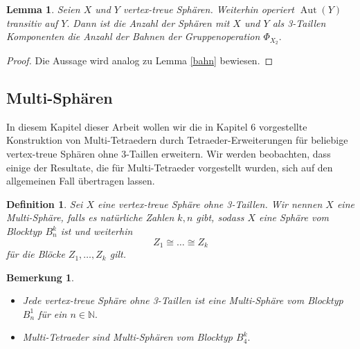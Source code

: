 \documentclass[12pt,titlepage,twoside,cleardoublepage]{article}
\theoremstyle{nummermitklammern}
\newtheorem{lemma}[temp]{Lemma}
\newtheorem{definition}[temp]{Definition}
\newtheorem{bemerkung}[temp]{Bemerkung}
\newtheorem{definition}[zahl]{Definition}
\newtheorem{lemma}[zahl]{Lemma}
\newtheorem{bemerkung}[zahl]{Bemerkung}
\numberwithin{equation}{section}
\DeclareMathOperator{\Aut}{Aut}
\begin{document}
\begin{lemma}
Seien $X$ und $Y$ vertex-treue Sphären. Weiterhin operiert $\Aut(Y)$ transitiv auf $Y.$ Dann ist die Anzahl der Sphären mit $X$ und $Y$ als 3-Taillen Komponenten die Anzahl der Bahnen der Gruppenoperation $\Phi_{X_2}.$
\end{lemma}
\begin{proof}
Die Aussage wird analog zu Lemma \ref{bahn} bewiesen.
\end{proof}
\subsection{Multi-Sphären}
In diesem Kapitel dieser Arbeit wollen wir die in Kapitel 6 vorgestellte Konstruktion von Multi-Tetraedern durch Tetraeder-Erweiterungen für beliebige vertex-treue Sphären ohne 3-Taillen erweitern. Wir werden beobachten, dass einige der Resultate, die für Multi-Tetraeder vorgestellt wurden, sich auf den allgemeinen Fall übertragen lassen.
\begin{definition}
Sei $X$ eine vertex-treue Sphäre ohne 3-Taillen. Wir nennen $X$ eine \emph{Multi-Sphäre}, falls es natürliche Zahlen $k,n$ gibt, sodass $X$ eine Sphäre vom Blocktyp $B_n^k$ ist und weiterhin
\[
Z_1\cong \ldots\cong Z_k
\]
für die Blöcke $Z_1,\ldots,Z_k$ gilt. 
\end{definition}
\begin{bemerkung}
\begin{itemize}
\item Jede vertex-treue Sphäre ohne 3-Taillen ist eine Multi-Sphäre vom Blocktyp $B_n^1$ für ein $n\in \mathbb{N}.$
\item Multi-Tetraeder sind Multi-Sphären vom Blocktyp $B_4^k.$
\end{itemize}
\end{bemerkung}
\end{document}
